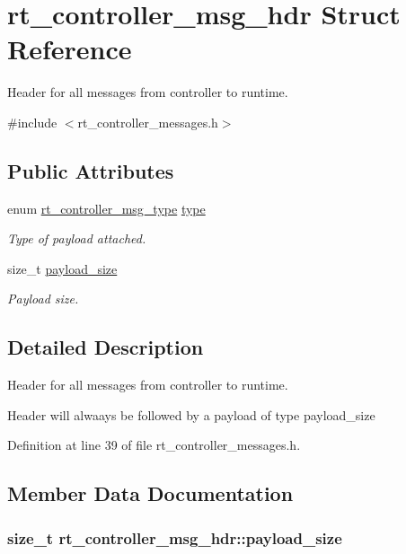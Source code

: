 \hypertarget{structrt__controller__msg__hdr}{\section{rt\-\_\-controller\-\_\-msg\-\_\-hdr Struct Reference}
\label{structrt__controller__msg__hdr}
}


Header for all messages from controller to runtime.  




{\ttfamily \#include $<$rt\-\_\-controller\-\_\-messages.\-h$>$}

\subsection*{Public Attributes}
\begin{DoxyCompactItemize}
\item 
enum \hyperlink{rt__controller__messages_8h_ab990cb7ec49a837b83bdb51c50903aeb}{rt\-\_\-controller\-\_\-msg\-\_\-type} \hyperlink{structrt__controller__msg__hdr_aeaaded0407c30884b04405eae9ecc9f3}{type}
\begin{DoxyCompactList}\small\item\em Type of payload attached. \end{DoxyCompactList}\item 
size\-\_\-t \hyperlink{structrt__controller__msg__hdr_adfd4a8c90b69662216de245f2d05b4b3}{payload\-\_\-size}
\begin{DoxyCompactList}\small\item\em Payload size. \end{DoxyCompactList}\end{DoxyCompactItemize}


\subsection{Detailed Description}
Header for all messages from controller to runtime. 

Header will alwaays be followed by a payload of type {\ttfamily payload\-\_\-size} 

Definition at line 39 of file rt\-\_\-controller\-\_\-messages.\-h.



\subsection{Member Data Documentation}
\hypertarget{structrt__controller__msg__hdr_adfd4a8c90b69662216de245f2d05b4b3}{
\subsubsection[{payload\-\_\-size}]{\setlength{\rightskip}{0pt plus 5cm}size\-\_\-t rt\-\_\-controller\-\_\-msg\-\_\-hdr\-::payload\-\_\-size}}\label{structrt__controller__msg__hdr_adfd4a8c90b69662216de245f2d05b4b3}



